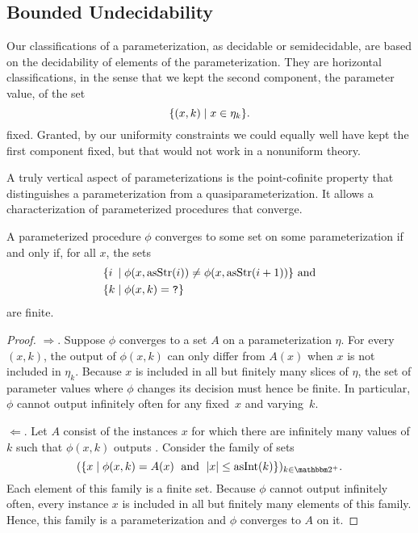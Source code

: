 \subsection{Bounded Undecidability}
\label{sec:computability:bounded}%
Our classifications of a parameterization, as decidable or semidecidable, are based on the decidability of elements of the parameterization.
They are horizontal classifications, in the sense that we kept the second component, the parameter value, of the set
\begin{equation*}
  \{(x, k) \;|\; x \in \eta_k\}.
\end{equation*}
fixed.
Granted, by our uniformity constraints we could equally well have kept the first component fixed, but that would not work in a nonuniform theory.

A truly vertical aspect of parameterizations is the point-cofinite property that distinguishes a parameterization from a quasiparameterization.
It allows a characterization of parameterized procedures that converge.
\begin{lemma}
\label{lem:convergent_finite}%
  A parameterized procedure $\phi$ converges to some set on some parameterization if and only if, for all $x$, the sets
  \begin{align*}
    &\{\mathrlap{i}\phantom{k} \st \phi(x, \asStr(i)) \neq \phi(x, \asStr(i + 1))\}\text{ and} \\
    &\{k \st \phi(x, k) = \bits{?}\}
  \end{align*}
  are finite.
\end{lemma}
\begin{proof}
  $\Longrightarrow$.
  Suppose $\phi$ converges to a set $A$ on a parameterization $\eta$.
  For every $(x, k)$, the output of $\phi(x, k)$ can only differ from $A(x)$ when $x$ is not included in $\eta_k$.
  Because $x$ is included in all but finitely many slices of $\eta$, the set of parameter values where $\phi$ changes its decision must hence be finite.
  In particular, $\phi$ cannot output  infinitely often for any fixed~$x$ and varying~$k$.

  $\Longleftarrow$.
  Let $A$ consist of the instances $x$ for which there are infinitely many values of $k$ such that $\phi(x, k)$ outputs .
  Consider the family of sets
  \begin{equation*}
    (\{x \st \phi(x, k) = A(x) \reland \length{x} \le \asNat(k)\})_{k \in \binary^+}.
  \end{equation*}
  Each element of this family is a finite set.
  Because $\phi$ cannot output  infinitely often, every instance $x$ is included in all but finitely many elements of this family.
  Hence, this family is a parameterization and $\phi$ converges to $A$ on it.
\end{proof}

